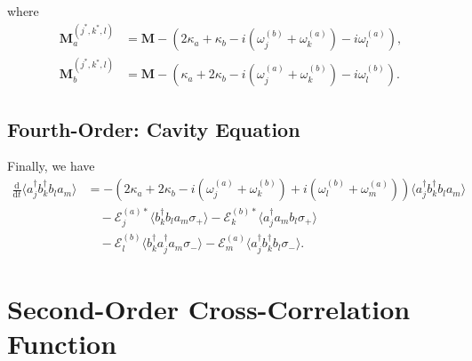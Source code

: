 \documentclass{article}
\newcommand{\ddt}[1][]{\frac{\mathrm{d} #1}{\mathrm{d}t}}
\begin{document}
where
\begin{subequations}
	\begin{align}
		\bm{M}^{(j^{*}, k^{*}, l)}_{a} &= \bm{M} - \left( 2 \kappa_{a} + \kappa_{b} - i \left( \omega_{j}^{(b)} + \omega_{k}^{(a)} \right) - i \omega_{l}^{(a)} \right), \\
		\bm{M}^{(j^{*}, k^{*}, l)}_{b} &= \bm{M} - \left( \kappa_{a} + 2 \kappa_{b} - i \left( \omega_{j}^{(a)} + \omega_{k}^{(b)} \right) - i \omega_{l}^{(b)} \right). 
	\end{align}
\end{subequations}

\subsection{Fourth-Order: Cavity Equation}

Finally, we have
\begin{align}
	\ddt \langle a^{\dagger}_{j} b^{\dagger}_{k} b_{l} a_{m} \rangle &= -\left( 2\kappa_{a} + 2 \kappa_{b} - i \left( \omega_{j}^{(a)} + \omega_{k}^{(b)} \right) + i \left( \omega_{l}^{(b)} + \omega_{m}^{(a)} \right) \right) \langle a^{\dagger}_{j} b^{\dagger}_{k} b_{l} a_{m} \rangle \nonumber \\
	&\quad - \mathcal{E}_{j}^{(a) *} \langle b^{\dagger}_{k} b_{l} a_{m} \sigma_{+} \rangle - \mathcal{E}_{k}^{(b) *} \langle a^{\dagger}_{j} a_{m} b_{l} \sigma_{+} \rangle \nonumber \\
	&\quad - \mathcal{E}_{l}^{(b)} \langle b^{\dagger}_{k} a^{\dagger}_{j} a_{m} \sigma_{-} \rangle - \mathcal{E}_{m}^{(a)} \langle a^{\dagger}_{j} b^{\dagger}_{k} b_{l} \sigma_{-} \rangle.
\end{align}

\section{Second-Order Cross-Correlation Function}
\end{document}

